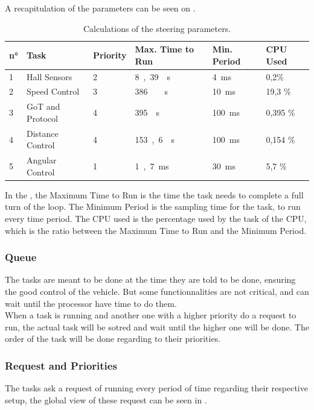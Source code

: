 A recapitulation of the parameters can be seen on .

\begin{table} [H]
	\begin{tabular}{|l|l|l|l|l|l|}
								
\hline
\textbf{n°}  & \textbf{Task}   	 & \textbf{Priority}	& \textbf{Max. Time to Run} 	& \textbf{Min. Period} & \textbf{CPU Used}\\
\hline
1			 &	Hall Sensors	 & 2				&	\si{8,39 \mu s}			    &	\si{4 ms}			  & 0,2\%	  \\
\hline
2			 &	Speed Control	 & 3				&	\si{386\ \mu s}				&	\si{10 ms}			  &	19,3 \%   \\
\hline
3			 &	GoT and Protocol & 4				&	\si{395 \mu s}			    &	\si{100 ms}			  &	0,395 \%  \\
\hline
4			 &	Distance Control & 4				&	\si{153,6 \mu s} 			&	\si{100 ms} 	  	  &	0,154 \%  \\
\hline
5			 &	Angular Control	 & 1				&	\si{1,7  ms}			    &	\si{30 ms}			  &	5,7 \%    \\
\hline		
	\end{tabular}
	\caption{Calculations of the steering parameters.}	
	\label{scheduleParameters}						
\end{table}	

In the , the Maximum Time to Run is the time the task needs to complete a full turn of the loop. The Minimum Period is the sampling time for the task, to run every time period. The CPU used is the percentage used by the task of the CPU, which is the ratio between the Maximum Time to Run and the Minimum Period.

\subsubsection{Queue}
The tasks are meant to be done at the time they are told to be done, ensuring the good control of the vehicle. But some functionnalities are not critical, and can wait until the processor have time to do them.\\
When a task is running and another one with a higher priority do a request to run, the actual task will be sotred and wait until the higher one will be done. The order of the task will be done regarding to their priorities.


\subsubsection{Request and Priorities}
The tasks ask a request of running every period of time regarding their respective setup, the global view of these request can be seen in .

